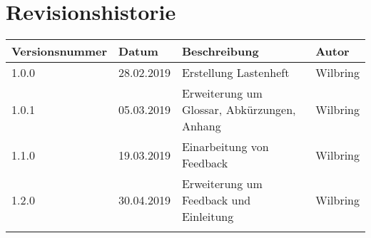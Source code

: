 \section*{Revisionshistorie}

\begin{tabular}{|p{3cm}|p{2cm}|p{5.5cm}|p{2cm}|}
\hline
Versionsnummer  & Datum         & Beschreibung          & Autor     \\
\hline
 1.0.0          & 28.02.2019    & Erstellung Lastenheft & Wilbring  \\\hline
 1.0.1          & 05.03.2019    & Erweiterung um Glossar, Abkürzungen, Anhang  & Wilbring      \\\hline
 1.1.0          & 19.03.2019    & Einarbeitung von Feedback & Wilbring \\\hline
 1.2.0          & 30.04.2019    & Erweiterung um Feedback und Einleitung & Wilbring \\\hline
                &               &                       &           \\\hline
\end{tabular}

